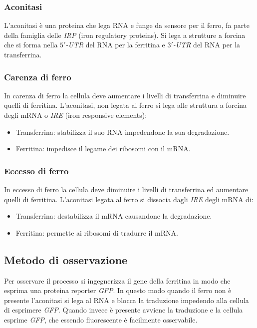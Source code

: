 		\subsubsection{Aconitasi}
		L'aconitasi \`e una proteina che lega RNA e funge da sensore per il ferro, fa parte della famiglia delle \emph{IRP} (iron regulatory proteins).
		Si lega a strutture a forcina che si forma nella \emph{$5'$-UTR} del RNA per la ferritina e \emph{$3'$-UTR} del RNA per la transferrina.

		\subsubsection{Carenza di ferro}
		In carenza di ferro la cellula deve aumentare i livelli di transferrina e diminuire quelli di ferritina.
		L'aconitasi, non legata al ferro si lega alle struttura a forcina degli mRNA o \emph{IRE} (iron responsive elements):
		\begin{itemize}
			\item Transferrina: stabilizza il suo RNA impedendone la sua degradazione.
			\item Ferritina: impedisce il legame dei ribosomi con il mRNA.
		\end{itemize}

		\subsubsection{Eccesso di ferro}
		In eccesso di ferro la cellula deve diminuire i livelli di transferrina ed aumentare quelli di ferritina.
		L'aconitasi legata al ferro si dissocia dagli \emph{IRE} degli mRNA di:
		\begin{itemize}
			\item Transferrina: destabilizza il mRNA causandone la degradazione.
			\item Ferritina: permette ai ribosomi di tradurre il mRNA.
		\end{itemize}
	
	\subsection{Metodo di osservazione}
	Per osservare il processo si ingegnerizza il gene della ferritina in modo che esprima una proteina reporter \emph{GFP}.
	In questo modo quando il ferro non \`e presente l'aconitasi si lega al RNA e blocca la traduzione impedendo alla cellula di esprimere \emph{GFP}.
	Quando invece \`e presente avviene la traduzione e la cellula esprime \emph{GFP}, che essendo fluorescente \`e facilmente osservabile.
